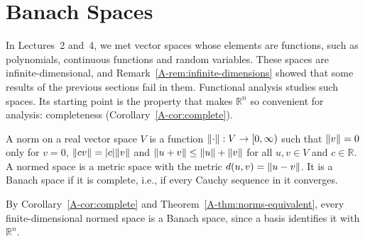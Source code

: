 \section{Banach Spaces}\label{A-sec:banach}

In Lectures~2 and~4, we met vector spaces whose elements are functions, such as polynomials, continuous functions and random variables. These spaces are infinite-dimensional, and Remark~\ref{A-rem:infinite-dimensions} showed that some results of the previous sections fail in them. Functional analysis studies such spaces. Its starting point is the property that makes $\mathbb{R}^n$ so convenient for analysis: completeness (Corollary~\ref{A-cor:complete}).

\begin{definition}\label{A-def:banach}
    A norm on a real vector space $V$ is a function $\lVert \cdot \rVert: V \to [0, \infty)$ such that $\lVert v \rVert = 0$ only for $v = 0$, $\lVert cv \rVert = |c|\lVert v \rVert$ and $\lVert u + v \rVert \leq \lVert u \rVert + \lVert v \rVert$ for all $u, v \in V$ and $c \in \mathbb{R}$. A normed space is a metric space with the metric $d(u, v) = \lVert u - v \rVert$. It is a Banach space if it is complete, i.e., if every Cauchy sequence in it converges.
\end{definition}

By Corollary~\ref{A-cor:complete} and Theorem~\ref{A-thm:norms-equivalent}, every finite-dimensional normed space is a Banach space, since a basis identifies it with $\mathbb{R}^n$.

